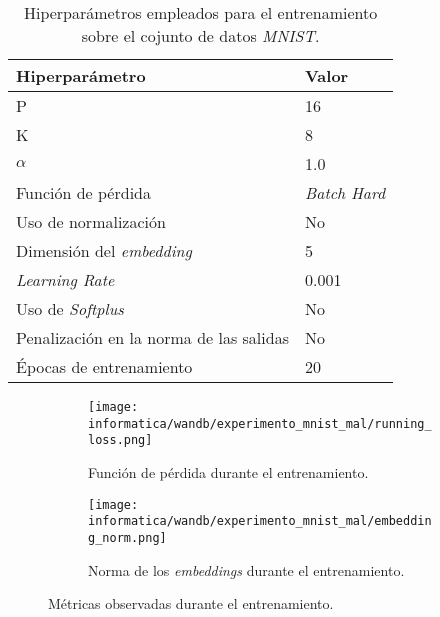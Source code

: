 \begin{table}[!hbtp]
\centering
\begin{tabular}{|l|l|}
    \hline
    Hiperparámetro & Valor \\
    \hline

    P & 16 \\
    K & 8 \\
    $\alpha$ & 1.0 \\
    Función de pérdida & \textit{Batch Hard} \\
    Uso de normalización & No \\
    Dimensión del \textit{embedding} & 5 \\
    \textit{Learning Rate} & 0.001 \\
    Uso de \textit{Softplus} & No \\
    Penalización en la norma de las salidas & No \\
    Épocas de entrenamiento & 20 \\
    \hline
\end{tabular}
\caption{Hiperparámetros empleados para el entrenamiento sobre el cojunto de datos \textit{MNIST}.}
    \label{table:hiperparametros_mnist_mal}
\end{table}

\begin{figure}
\ajustarsubcaptions
\centering
    \begin{subfigure}{.5\textwidth}
        \centering
        \texttt{[image: informatica/wandb/experimento\_mnist\_mal/running\_loss.png]}
        \caption{Función de pérdida durante el entrenamiento.}
    \end{subfigure}%
    \begin{subfigure}{.5\textwidth}
        \centering
        \texttt{[image: informatica/wandb/experimento\_mnist\_mal/embedding\_norm.png]}
        \caption{Norma de los \textit{embeddings} durante el entrenamiento.}
    \end{subfigure}
    \label{img:progreso_entrenamiento_mnist_mal}
\caption{Métricas observadas durante el entrenamiento.}
\end{figure}


